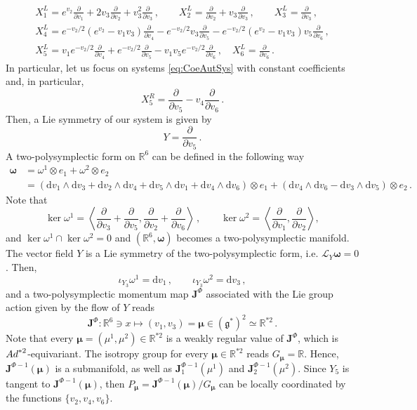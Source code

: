 \documentclass[11pt]{article}
\theoremstyle{plain}
\theoremstyle{definition}
\newcommand{\R}{\mathbb{R}}
\newcommand{\bomega}{{\boldsymbol{\omega}}}
\renewcommand{\d}{\mathrm{d}}
\newcommand{\Lie}{\mathscr{L}}
\newcommand{\X}{\mathfrak{X}}
\newcommand{\parder}[2]{\frac{\partial #1}{\partial #2}}
\def\d{\mathrm{d}}
\numberwithin{equation}{section}
\begin{document}
\begin{equation}\label{Eq:Rel2}
\begin{gathered}
X^L_1=e^{v_2}\frac{\partial}{\partial v_1}+2v_3\frac{\partial }{\partial v_2}+v_3^2\frac{\partial }{\partial v_3}\,,\qquad
X^L_2=\frac{\partial}{\partial v_2}+v_3\frac{\partial }{\partial v_3}\,,\qquad
X^L_3=\frac{\partial }{\partial v_3}\,,\\
X^L_4=e^{-v_2/2}(e^{v_2}-v_1v_3)\frac{\partial }{\partial v_4}-e^{-v_2/2}v_3\frac{\partial}{\partial v_5}-e^{-v_2/2}(e^{v_2}-v_1v_3)v_5\frac{\partial }{\partial v_6}\,,\\X^L_5=v_1e^{-v_2/2}\frac{\partial }{\partial v_4}+e^{-v_2/2}\frac{\partial}{\partial v_5}-v_1v_5e^{-v_2/2}\frac{\partial}{\partial v_6}\,,\quad X^L_6=\frac{\partial }{\partial v_6}\,.
\end{gathered}
\end{equation}
In particular, let us focus on systems \eqref{eq:CoeAutSys} with constant coefficients and, in particular,  
$$
X^R_5 = \frac{\partial}{\partial v_5}-v_4\frac{\partial}{\partial v_6}\,.
$$
Then, a Lie symmetry of our system is given by
$$
Y = \frac{\partial}{\partial v_5}\,.
$$
A two-polysymplectic form on $\R^6$ can be defined in the following way
\begin{align*}
  \bm\omega &= \omega^1\otimes e_1+\omega^2\otimes e_2 \\
  &= \left(\d v_1\wedge \d v_3 + \d v_2\wedge \d v_4 + \d v_5\wedge \d v_1 + \d v_4\wedge\d v_6\right)\otimes e_1+\left( \d v_4\wedge\d v_6 - \d v_3\wedge\d v_5\right)\otimes e_2\,.
\end{align*}
Note that
$$
    \ker\omega^1 = \left\langle \parder{}{v_3} + \parder{}{v_5},\parder{}{v_2} + \parder{}{v_6}\right\rangle\,,\qquad 
    \ker\omega^2 = \left\langle \parder{}{v_1},\parder{}{v_2} \right\rangle,
$$
and $\ker\omega^1\cap\ker\omega^2=0$ and $(\R^6,\bm\omega)$ becomes a two-polysymplectic manifold. The vector field $Y$ is a Lie symmetry of the two-polysymplectic form, i.e. $\Lie_{Y}\bomega=0$. Then,
\[
\iota_{Y_3}\omega^1 = \d v_1\,,\qquad\iota_{Y_3}\omega^2 = \d v_3\,,
\]
and a two-polysymplectic momentum map $\mathbf{J}^\Phi$ associated with the Lie group action given by the flow of $Y$ reads
\[
\mathbf{J}^\Phi:\R^6\ni x \longmapsto (v_1,v_3)=\bm\mu\in (\mathfrak{g}^*)^2\simeq \R^{*2}\,.
\]
Note that every $\bm\mu=(\mu^1,\mu^2)\in \mathbb{R}^{*2}$ is a weakly regular value of $\mathbf{J}^\Phi$, which is ${\rm Ad}^{*2}$-equivariant. The isotropy group for every $\bm\mu \in \mathbb{R}^{*2}$ reads $G_{\bm\mu}=\mathbb{R}$. Hence, $\mathbf{J}^{\Phi-1}(\bm{\mu})$ is a submanifold, as well as $\mathbf{J}_1^{\Phi-1}(\mu^1)$ and $\mathbf{J}_2^{\Phi-1}(\mu^2)$. Since $Y_5$ is tangent to  $\mathbf{J}^{\Phi-1}(\bm{\mu})$, then $P_{\bm{ \mu}}=\mathbf{J}^{\Phi-1}(\bm{\mu})/G_{\bm \mu}$ can be locally coordinated by the functions $\{v_2,v_4,v_6\}$.  
\end{document}

